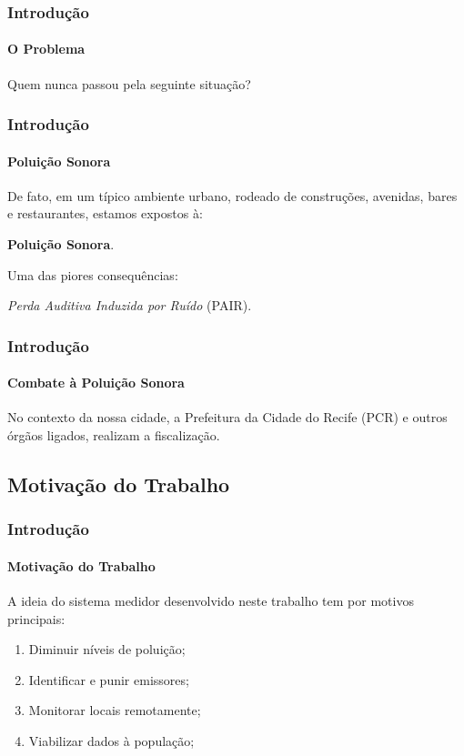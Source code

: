 \documentclass[brazil]{beamer}
\begin{document}
	\begin{frame}
		\frametitle{Introdução}
		\framesubtitle{O Problema}
		\begin{center}
			Quem nunca passou pela seguinte situação?
		\end{center}
	\end{frame}

	\begin{frame}
		\frametitle{Introdução}
		\framesubtitle{Poluição Sonora}
		De fato, em um típico ambiente urbano, rodeado de construções, avenidas, bares e restaurantes, estamos expostos à:\\[0.5cm] 
		\begin{center}
			\textbf{Poluição Sonora}.
		\end{center}
		\pause
		\begin{flushleft}
			Uma das piores consequências:
		\end{flushleft} 
		\begin{center}
			\textit{Perda Auditiva Induzida por Ruído} (PAIR).
		\end{center}
		
	\end{frame}

	\begin{frame}
		\frametitle{Introdução}
		\framesubtitle{Combate à Poluição Sonora}
		\vspace{0.5cm}
		No contexto da nossa cidade, a Prefeitura da Cidade do Recife (PCR) e outros órgãos ligados, realizam a fiscalização.
	\end{frame}

	\subsection{Motivação do Trabalho}

	\begin{frame}
		\frametitle{Introdução}
		\framesubtitle{Motivação do Trabalho}
		A ideia do sistema medidor desenvolvido neste trabalho tem por motivos principais:\\[0.2cm]
		\begin{enumerate}
			\item Diminuir níveis de poluição; %
			\item Identificar e punir emissores; %
			\item Monitorar locais remotamente;
			\item Viabilizar dados à população;
		\end{enumerate}
	\end{frame}
\end{document}
